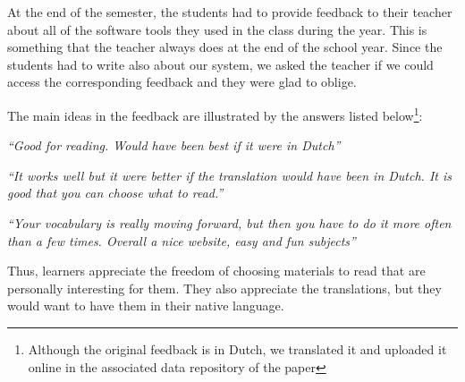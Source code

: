 

At the end of the semester, the students had to provide feedback to their teacher about all of the software tools they used in the class during the year. This is something that the teacher always does at the end of the school year. Since the students had to write also about our system, we asked the teacher if we could access the corresponding feedback and they were glad to oblige. 

The main ideas in the feedback are illustrated by the answers listed below\footnote{Although the original feedback is in Dutch, we translated it and uploaded it online in the associated data repository of the paper}: 

\begin{description}
  \item {\em ``Good for reading. Would have been best if it were in Dutch''}
  \item {\em ``It works well but it were better if the translation would have been in Dutch. It is good that you can choose what to read.''}
  \item {\em ``Your vocabulary is really moving forward, but then you have to do it more often than a few times. Overall a nice website, easy and fun subjects''}
\end{description}

Thus, learners appreciate the freedom of choosing materials to read that are personally interesting for them. They also appreciate the translations, but they would want to have them in their native language. 



